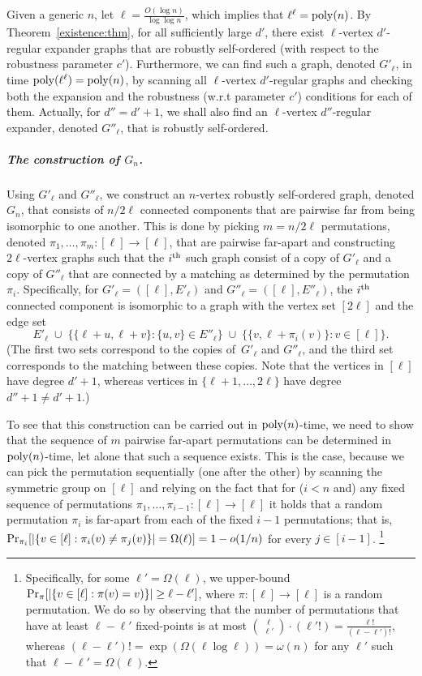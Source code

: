 \documentclass[10pt,a4paper]{article}
\theoremstyle{definition}
\newcommand{\prob}{{\rm Pr}}
\newcommand{\xth}{{\rm th}}
\newcommand{\mypar}[1]{\subparagraph{{#1}}}
\newcommand{\poly}{{\rm poly}}
\begin{document}
Given a generic $n$, let $\ell=\frac{O(\log n)}{\log\log n}$,
which implies that $\ell^\ell=\poly(n)$.
By Theorem~\ref{existence:thm}, for all sufficiently large $d'$,
there exist $\ell$-vertex $d'$-regular expander graphs
that are robustly self-ordered
(with respect to the robustness parameter $c'$).
Furthermore, we can find such a graph, denoted $G'_\ell$,
in time $\poly(\ell^\ell)=\poly(n)$,
by scanning all $\ell$-vertex $d'$-regular graphs and checking
both the expansion and the robustness (w.r.t parameter $c'$)
conditions for each of them.
%
%
%
Actually, for $d''=d'+1$, we shall also find
an $\ell$-vertex $d''$-regular expander, denoted $G''_\ell$,
that is robustly self-ordered.

\mypar{The construction of $G_n$.}
Using $G'_\ell$ and $G''_\ell$, we construct an $n$-vertex
robustly self-ordered graph, denoted $G_n$,
that consists of $n/2\ell$ connected components that
are pairwise far from being isomorphic to one another.
This is done by picking $m=n/2\ell$ permutations,
denoted $\pi_1,\ldots,\pi_m:[\ell]\to[\ell]$,
that are pairwise far-apart
and constructing $2\ell$-vertex graphs
such that the $i^\xth$ such graph consist of
a copy of $G'_\ell$ and a copy of $G''_\ell$ that are connected
by a matching as determined by the permutation $\pi_i$.
Specifically,
for $G'_\ell=([\ell],E'_\ell)$ and $G''_\ell=([\ell],E''_\ell)$,
the $i^\xth$ connected component is isomorphic
to a graph with the vertex set $[2\ell]$
and the edge set
\begin{equation}\label{edges-of-cc:eq1}
E'_\ell \;\cup\; \{\{\ell+u,\ell+v\}:\{u,v\}\in E''_\ell\}
         \;\cup\; \{\{v,\ell+\pi_i(v)\}:v\!\in\![\ell]\}.
\end{equation}
(The first two sets correspond to the copies of~$G'_\ell$ and $G''_\ell$,
and the third set corresponds to the matching between these copies.
Note that the vertices in $[\ell]$ have degree $d'+1$,
whereas vertices in $\{\ell+1,\ldots,2\ell\}$ have degree $d''+1\neq d'+1$.)


To see that this construction can be carried out in $\poly(n)$-time,
we need to show that the sequence of $m$ pairwise far-apart permutations
can be determined in $\poly(n)$-time, let alone that such a sequence exists.
This is the case, because we can pick the permutation sequentially
(one after the other) by scanning the symmetric group on $[\ell]$
and relying on the fact that for ($i<n$ and) any fixed sequence
of permutations $\pi_1,\ldots,\pi_{i-1}:[\ell]\to[\ell]$
it holds that a random permutation $\pi_i$ is far-apart from
each of the fixed $i-1$ permutations; that is,
$\prob_{\pi_i}[|\{v\in[\ell]:\pi_i(v)\neq\pi_j(v)\}|=\Omega(\ell)]=1-o(1/n)$
for every $j\in[i-1]$.
\footnote{Specifically, for some $\ell'=\Omega(\ell)$,
we upper-bound $\prob_{\pi}[|\{v\in[\ell]:\pi(v)=v)\}|\geq\ell-\ell']$,
where $\pi:[\ell]\to[\ell]$ is a random permutation.
We do so by observing that the number of permutations
that have at least $\ell-\ell'$ fixed-points is at most
$\binom{\ell}{\ell'}\cdot(\ell'!)=\frac{\ell!}{(\ell-\ell')!}$,
whereas $(\ell-\ell')!=\exp(\Omega(\ell\log\ell))=\omega(n)$
for any $\ell'$ such that $\ell-\ell'=\Omega(\ell)$.}
%
%
\end{document}
